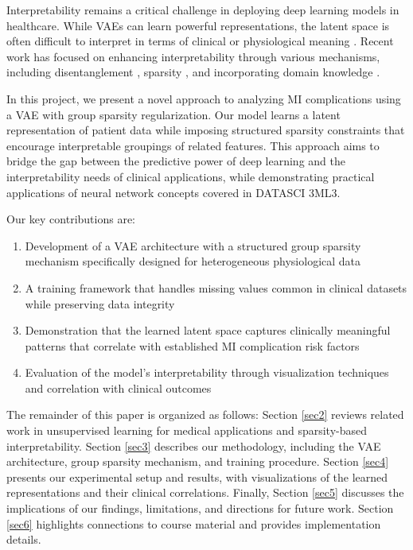 \documentclass[oupdraft]{bio}
\begin{document}
Interpretability remains a critical challenge in deploying deep learning models in healthcare. While VAEs can learn powerful representations, the latent space is often difficult to interpret in terms of clinical or physiological meaning \citep{Basu2018}. Recent work has focused on enhancing interpretability through various mechanisms, including disentanglement \citep{Higgins2017}, sparsity \citep{Tonekaboni2019}, and incorporating domain knowledge \citep{Ma2019}.

In this project, we present a novel approach to analyzing MI complications using a VAE with group sparsity regularization. Our model learns a latent representation of patient data while imposing structured sparsity constraints that encourage interpretable groupings of related features. This approach aims to bridge the gap between the predictive power of deep learning and the interpretability needs of clinical applications, while demonstrating practical applications of neural network concepts covered in DATASCI 3ML3.

Our key contributions are:
\begin{enumerate}
\item Development of a VAE architecture with a structured group sparsity mechanism specifically designed for heterogeneous physiological data
\item A training framework that handles missing values common in clinical datasets while preserving data integrity
\item Demonstration that the learned latent space captures clinically meaningful patterns that correlate with established MI complication risk factors
\item Evaluation of the model's interpretability through visualization techniques and correlation with clinical outcomes
\end{enumerate}

The remainder of this paper is organized as follows: Section \ref{sec2} reviews related work in unsupervised learning for medical applications and sparsity-based interpretability. Section \ref{sec3} describes our methodology, including the VAE architecture, group sparsity mechanism, and training procedure. Section \ref{sec4} presents our experimental setup and results, with visualizations of the learned representations and their clinical correlations. Finally, Section \ref{sec5} discusses the implications of our findings, limitations, and directions for future work. Section \ref{sec6} highlights connections to course material and provides implementation details.
\end{document}
